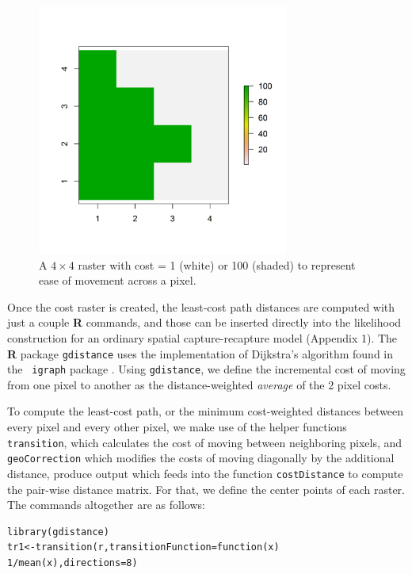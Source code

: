 \documentclass[12pt]{article}
\begin{document}
\begin{spacing}{1.2}
\begin{figure}
\begin{center}
\includegraphics[height=3.25in,width=3.25in]{raster_2values}
\end{center}
\caption{A $4 \times 4$ raster with cost = 1 (white) or 100 (shaded) to represent ease of movement across a pixel.}
\label{ecoldist.fig.raster}
\end{figure}


Once the cost raster is created, the
least-cost path distances are computed with just a couple {\bf R}
commands, and those can be inserted directly into the likelihood
construction for an ordinary spatial capture-recapture model (Appendix
1). The {\bf R} package \mbox{\tt gdistance} uses the implementation
of Dijkstra's algorithm \citep{dijkstra:1959} found in the \mbox{\tt
  igraph} package \citep{csardi:2010}.  Using \mbox{\tt gdistance},
we define the incremental cost of moving from one pixel
to another as the distance-weighted {\it average} of the 2 pixel
costs.

To compute the least-cost path, or the minimum cost-weighted
distances between every pixel and every other pixel, we make use of 
the helper functions \mbox{\tt transition}, which
calculates the cost of moving between neighboring pixels, and
\mbox{\tt geoCorrection} which modifies the costs of moving diagonally
by the additional distance, produce output which feeds into the
function \mbox{\tt costDistance} to compute the pair-wise distance
matrix. For that, we define the center points of each raster.  The
commands altogether are as follows:

\begin{verbatim}
library(gdistance)
tr1<-transition(r,transitionFunction=function(x) 1/mean(x),directions=8)


\end{verbatim}
\end{spacing}
\end{document}
